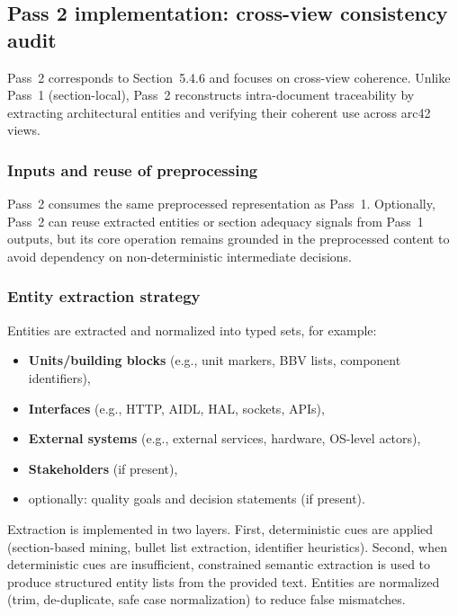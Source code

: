 \subsection{Pass 2 implementation: cross-view consistency audit}
Pass~2 corresponds to Section~5.4.6 and focuses on cross-view coherence. Unlike Pass~1 (section-local), Pass~2 reconstructs intra-document traceability by extracting architectural entities and verifying their coherent use across arc42 views.

\subsubsection{Inputs and reuse of preprocessing}
Pass~2 consumes the same preprocessed representation as Pass~1. Optionally, Pass~2 can reuse extracted entities or section adequacy signals from Pass~1 outputs, but its core operation remains grounded in the preprocessed content to avoid dependency on non-deterministic intermediate decisions.

\subsubsection{Entity extraction strategy}
Entities are extracted and normalized into typed sets, for example:
\begin{itemize}
    \item \textbf{Units/building blocks} (e.g., unit markers, BBV lists, component identifiers),
    \item \textbf{Interfaces} (e.g., HTTP, AIDL, HAL, sockets, APIs),
    \item \textbf{External systems} (e.g., external services, hardware, OS-level actors),
    \item \textbf{Stakeholders} (if present),
    \item optionally: quality goals and decision statements (if present).
\end{itemize}

Extraction is implemented in two layers. First, deterministic cues are applied (section-based mining, bullet list extraction, identifier heuristics). Second, when deterministic cues are insufficient, constrained semantic extraction is used to produce structured entity lists from the provided text. Entities are normalized (trim, de-duplicate, safe case normalization) to reduce false mismatches.

